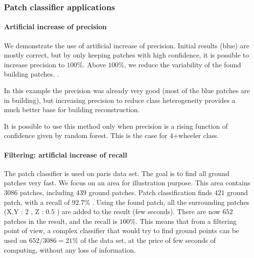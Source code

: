 		\subsubsection{Patch classifier applications} 
			
			\paragraph{Artificial increase of precision}
				We demonstrate the use of artificial increase of precision. Initial results (blue) are mostly correct, but by only keeping patches with high confidence, it is possible to increase precision to $100$\%. Above $100$\%, we reduce the variability of the found building patches. 
				.
				
				In this example the precision was already very good (most of the blue patches are in building), but increasing precision to reduce class heterogeneity provides a much better base for building reconstruction.
				
				It is possible to use this method only when precision is  a rising function of confidence given by random forest.
				This is the case for 4+wheeler class.  
			\paragraph{Filtering: artificial increase of recall}
				The patch classifier is used on paris data set.
				The goal is to find all ground patches very fast.
				We focus on an area for illustration purpose. This area contains $3086$ patches, including $439$ ground patches.
				Patch classification finds $421$ ground patch, 
				with a recall of $92.7$\% .
				Using the found patch, all the surrounding patches (X,Y : $2$ \meter, Z : $0.5$ \meter ) are added to the result (few seconds).
				There are now $652$ patches in the result, and the recall is $100$\%.
				This means that from a filtering point of view, a complex classifier that would try to find ground points can be used on $652/3086=21\%$ of the data set, at the price of few seconds of computing, without any loss of information.
				
					 	  
